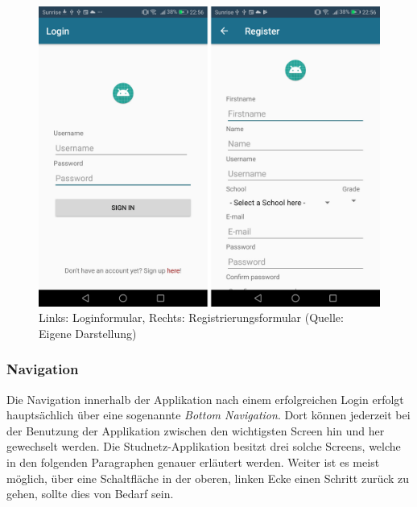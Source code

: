 \documentclass[../main.tex]{subfiles}
\begin{document}
\begin{figure} 
	\centering
	\includegraphics[width=\textwidth]{./images/login_register.pdf}
	\caption{Links: Loginformular, Rechts: Registrierungsformular (Quelle: Eigene Darstellung)}
	\label{login_register}
\end{figure}

\subsubsection*{Navigation}
Die Navigation innerhalb der Applikation nach einem erfolgreichen Login erfolgt hauptsächlich über eine sogenannte \emph{Bottom Navigation}. Dort können jederzeit bei der Benutzung der Applikation zwischen den wichtigsten Screen hin und her gewechselt werden. Die Studnetz-Applikation besitzt drei solche Screens, welche in den folgenden Paragraphen genauer erläutert werden. Weiter ist es meist möglich, über eine Schaltfläche in der oberen, linken Ecke einen Schritt zurück zu gehen, sollte dies von Bedarf sein.
\end{document}
